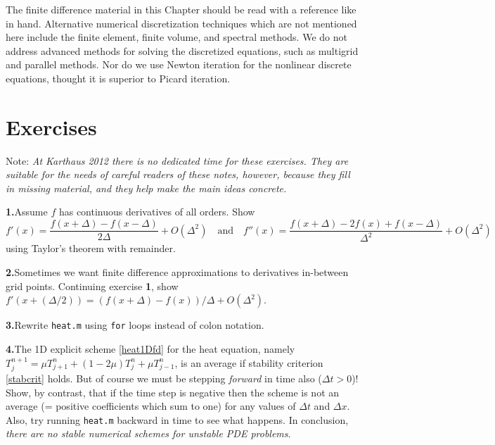 \documentclass[titlepage,letterpaper,final,12pt]{scrartcl}
\begin{document}
The finite difference material in this Chapter should be read with a reference like \cite{MortonMayers} in hand.  Alternative numerical discretization techniques which are not mentioned here include the finite element, finite volume, and spectral methods.  We do not address advanced methods for solving the discretized equations, such as multigrid and parallel methods.  Nor do we use Newton iteration \cite{Kelley} for the nonlinear discrete equations, thought it is superior to Picard iteration.


\footnotesize



\small
\section*{Exercises}

\newcommand{\exer}[2]{\medskip\noindent \textbf{#1.}\quad #2}

Note:  \emph{At Karthaus 2012 there is no dedicated time for these exercises.  They are suitable for the needs of careful readers of these notes, however, because they fill in missing material, and they help make the main ideas concrete.}


\exer{1}{Assume $f$ has continuous derivatives of all orders.  Show
  $$f'(x) = \frac{f(x+\Delta) - f(x-\Delta)}{2\Delta} + O(\Delta^2) \quad \text{and} \quad f''(x) = \frac{f(x+\Delta) - 2 f(x) + f(x-\Delta)}{\Delta^2} + O(\Delta^2)$$
using Taylor's theorem with remainder.}

\exer{2}{Sometimes we want finite difference approximations to derivatives in-between grid points.  Continuing exercise \textbf{1}, show $f'(x+(\Delta/2)) = (f(x+\Delta) - f(x))/\Delta + O(\Delta^2)$.}

\exer{3}{Rewrite \texttt{heat.m} using \texttt{for} loops instead of colon notation.}

\exer{4}{The 1D explicit scheme \eqref{heat1Dfd} for the heat equation, namely $T_j^{n+1} = \mu T_{j+1}^n + (1 - 2 \mu) T_j^n + \mu T_{j-1}^n$, is an average if stability criterion \eqref{stabcrit} holds.  But of course we must be stepping \emph{forward} in time also ($\Delta t>0$)!  Show, by contrast, that if the time step is negative then the scheme is not an average (= positive coefficients which sum to one) for any values of $\Delta t$ and $\Delta x$.  Also, try running \texttt{heat.m} backward in time to see what happens.  In conclusion, \emph{there are no stable numerical schemes for unstable PDE problems}.}
\end{document}
